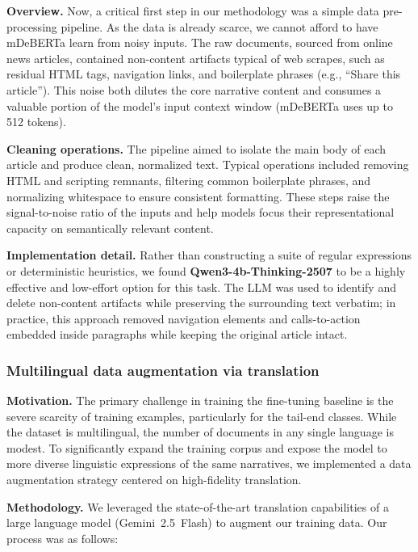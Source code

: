\noindent\textbf{Overview.} Now, a critical first step in our methodology was a simple data pre-processing pipeline. As the data is already scarce, we cannot afford to have mDeBERTa learn from noisy inputs. The raw documents, sourced from online news articles, contained non-content artifacts typical of web scrapes, such as residual HTML tags, navigation links, and boilerplate phrases (e.g., ``Share this article''). This noise both dilutes the core narrative content and consumes a valuable portion of the model's input context window (mDeBERTa uses up to 512 tokens).

\medskip
\noindent\textbf{Cleaning operations.} The pipeline aimed to isolate the main body of each article and produce clean, normalized text. Typical operations included removing HTML and scripting remnants, filtering common boilerplate phrases, and normalizing whitespace to ensure consistent formatting. These steps raise the signal-to-noise ratio of the inputs and help models focus their representational capacity on semantically relevant content.

\medskip
\noindent\textbf{Implementation detail.} Rather than constructing a suite of regular expressions or deterministic heuristics, we found \textbf{Qwen3-4b-Thinking-2507} to be a highly effective and low-effort option for this task. The LLM was used to identify and delete non-content artifacts while preserving the surrounding text verbatim; in practice, this approach removed navigation elements and calls-to-action embedded inside paragraphs while keeping the original article intact.

\subsubsection{Multilingual data augmentation via translation}

\noindent\textbf{Motivation.} The primary challenge in training the fine-tuning baseline is the severe scarcity of training examples, particularly for the tail-end classes. While the dataset is multilingual, the number of documents in any single language is modest. To significantly expand the training corpus and expose the model to more diverse linguistic expressions of the same narratives, we implemented a data augmentation strategy centered on high-fidelity translation.

\medskip
\noindent\textbf{Methodology.} We leveraged the state-of-the-art translation capabilities of a large language model (Gemini~2.5~Flash) to augment our training data. Our process was as follows:

